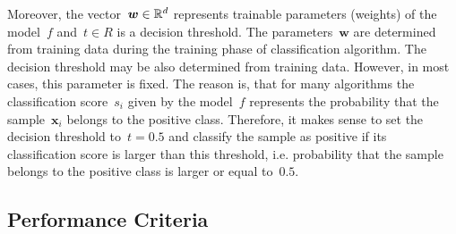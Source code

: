 Moreover, the vector~$\bm{w} \in \mathbb{R}^d$ represents trainable parameters (weights) of the model~$f$ and~$t \in R$ is a decision threshold. The parameters~$\bm{w}$ are determined from training data during the training phase of classification algorithm. The decision threshold may be also determined from training data. However, in most cases, this parameter is fixed. The reason is, that for many algorithms the classification score~$s_i$ given by the model~$f$ represents the probability that the sample~$\bm{x}_i$ belongs to the positive class. Therefore, it makes sense to set the decision threshold to~$t = 0.5$ and classify the sample as positive if its classification score is larger than this threshold, i.e. probability that the sample belongs to the positive class is larger or equal to~$0.5.$

\subsection{Performance Criteria}

